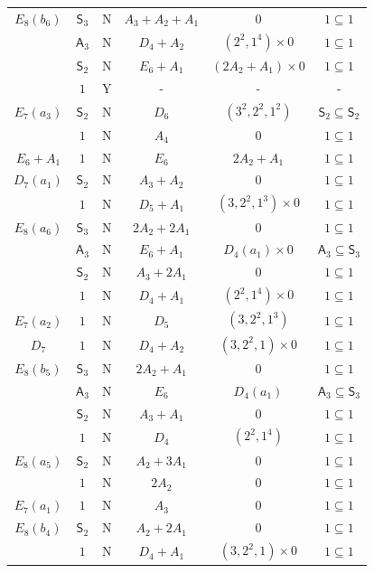 \documentclass[11pt]{amsart}
\newcommand{\Alt}{{\mathsf{A}}}
\newcommand{\Sym}{{\mathsf{S}}}
\numberwithin{equation}{section}
\begin{document}
\begin{center}
\begin{longtable}{|c|c|c|c|c|c|}
			\hline
			$E_8(b_6)$ & $\Sym_3$ & N & $A_3 + A_2 + A_1$ & $0$ & $1\subseteq 1$ \\
			& $\Alt_3$ & N &  $D_4+ A_2$ & $(2^2,1^4)\times 0$ & $1\subseteq 1$ \\
			& $\Sym_2$ & N & $E_6 + A_1$ & $(2A_2 + A_1)\times 0$ & $1\subseteq 1$ \\
			& $1$ & Y & - & - & - \\
			\hline
			$E_7(a_3)$ & $\Sym_2$ & N & $D_6$ & $(3^2,2^2,1^2)$ & $\Sym_2\subseteq \Sym_2$\\
			& $1$ & N & $A_4$ & $0$ & $1\subseteq 1$ \\
			\hline
			$E_6+A_1$ & $1$ & N & $E_6$ & $2A_2+A_1$ & $1\subseteq 1$ \\
			\hline
			$D_7(a_1)$ & $\Sym_2$ & N & $A_3 + A_2$ & $0$ & $1\subseteq 1$ \\
			& $1$ & N & $ D_5 + A_1$ & $(3,2^2,1^3)\times 0$ & $1\subseteq 1$\\
			\hline
			$E_8(a_6)$ & $\Sym_3$ & N & $2 A_2 + 2 A_1$ & $0$ & $1\subseteq 1$ \\
			& $\Alt_3$ & N & $E_6 + A_1$ & $D_4(a_1)\times 0$ & $\Alt_3\subseteq \Sym_3$ \\
			& $\Sym_2$   & N & $A_3 + 2 A_1$ & $0$ & $1\subseteq 1$  \\
			& $1$ & N & $D_4 + A_1$ & $(2^2,1^4)\times 0$ & $1\subseteq 1$ \\
			\hline
			$E_7(a_2)$ & $1$ & N & $D_5$ & $(3,2^2,1^3)$ & $1\subseteq 1$ \\
			\hline
			$D_7$ & $1$ & N & $D_4 + A_2$ & $(3,2^2,1)\times 0$ & $1\subseteq 1$ \\
			\hline
			$E_8(b_5)$ & $\Sym_3$ & N & $2 A_2 + A_1$ & $0$ & $1\subseteq 1$ \\
			& $\Alt_3$ & N & $E_6$ & $D_4(a_1)$ & $\Alt_3\subseteq \Sym_3$  \\
			& $\Sym_2$ & N & $A_3 + A_1$ & $0$ & $1\subseteq 1$ \\
			& $1$ & N & $D_4$ & $(2^2,1^4)$ & $1\subseteq 1$ \\
			\hline
			$E_8(a_5)$ & $\Sym_2$ & N & $A_2 + 3 A_1$ & $0$ & $1\subseteq 1$ \\
			& $1$ & N & $2 A_2$ & $0$ & $1\subseteq 1$ \\
			\hline
			$E_7(a_1)$ & $1$ & N & $A_3$ & $0$ & $1\subseteq 1$ \\
			\hline
			$E_8(b_4)$ & $\Sym_2$ & N & $A_2 + 2 A_1$ & $0$ & $1\subseteq 1$ \\
			& $1$ & N & $D_4 + A_1$ & $(3,2^2,1)\times 0$ & $1\subseteq 1$ \\

\end{longtable}
\end{center}
\end{document}
